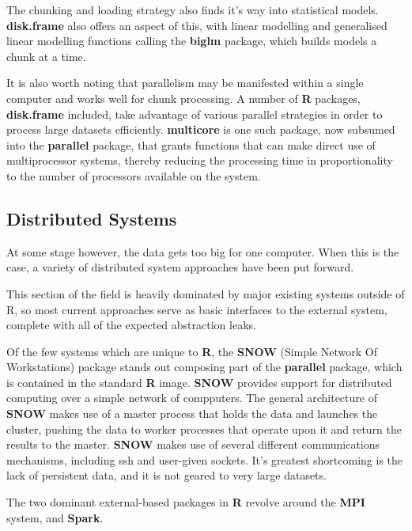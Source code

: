 The chunking and loading strategy also finds it's way into statistical models.
\textbf{disk.frame} also offers an aspect of this, with linear modelling and generalised linear modelling functions calling the \textbf{biglm} package, which builds models a chunk at a time\cite{lumley13}.

It is also worth noting that parallelism may be manifested within a single computer and works well for chunk processing.
A number of \textbf{R} packages, \textbf{disk.frame} included, take advantage of various parallel strategies in order to process large datasets efficiently.
\textbf{multicore} is one such package, now subsumed into the \textbf{parallel} package, that grants functions that can make direct use of multiprocessor systems, thereby reducing the processing time in proportionality to the number of processors available on the system\cite{team20:_r}.

\subsection{Distributed Systems}

At some stage however, the data gets too big for one computer.
When this is the case, a variety of distributed system approaches have been put forward.

This section of the field is heavily dominated by major existing systems outside of R, so most current approaches serve as basic interfaces to the external system, complete with all of the expected abstraction leaks\cite{spolsky2002abstraction}.

Of the few systems which are unique to \textbf{R}, the \textbf{SNOW} (Simple Network Of Workstations) package stands out composing part of the \textbf{parallel} package, which is contained in the standard \textbf{R} image\cite{tierney18}.
\textbf{SNOW} provides support for distributed computing over a simple network of compputers.
The general architecture of \textbf{SNOW} makes use of a master process that holds the data and launches the cluster, pushing the data to worker processes that operate upon it and return the results to the master.
\textbf{SNOW} makes use of several different communications mechanisms, including ssh and user-given sockets.
It's greatest shortcoming is the lack of persistent data, and it is not geared to very large datasets.

The two dominant external-based packages in \textbf{R} revolve around the \textbf{MPI} system, and \textbf{Spark}.

